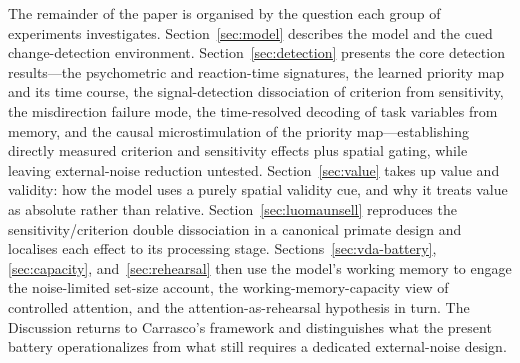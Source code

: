 The remainder of the paper is organised by the question each group of
experiments investigates. Section~\ref{sec:model} describes the model and the
cued change-detection environment. Section~\ref{sec:detection} presents the core
detection results---the psychometric and reaction-time signatures, the learned
priority map and its time course, the signal-detection dissociation of criterion
from sensitivity, the misdirection failure mode, the time-resolved decoding of
task variables from memory, and the causal microstimulation of the priority
map---establishing directly measured criterion and sensitivity effects plus spatial
gating, while leaving external-noise reduction untested. Section~\ref{sec:value} takes up value and validity: how the
model uses a purely spatial validity cue, and why it treats value as absolute
rather than relative. Section~\ref{sec:luomaunsell} reproduces the
sensitivity/criterion double dissociation in a canonical primate design and
localises each effect to its processing stage. Sections~\ref{sec:vda-battery},
\ref{sec:capacity}, and~\ref{sec:rehearsal} then use the model's working memory
to engage the noise-limited set-size account, the working-memory-capacity view
of controlled attention, and the attention-as-rehearsal hypothesis in turn. The
Discussion returns to Carrasco's framework and distinguishes what the present
battery operationalizes from what still requires a dedicated external-noise design.
